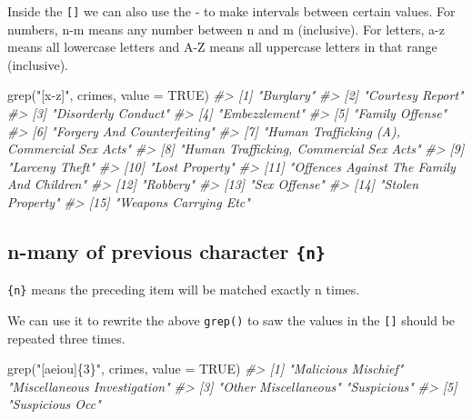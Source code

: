 \documentclass[
  12pt,
]{book}
\newenvironment{Shaded}{\begin{snugshade}}{\end{snugshade}}
\newcommand{\AttributeTok}[1]{\textcolor[rgb]{0.61,0.61,0.61}{#1}}
\newcommand{\CommentTok}[1]{\textcolor[rgb]{0.37,0.37,0.37}{\textit{#1}}}
\newcommand{\ConstantTok}[1]{\textcolor[rgb]{0,0,0}{#1}}
\newcommand{\FunctionTok}[1]{\textcolor[rgb]{0,0,0}{#1}}
\newcommand{\NormalTok}[1]{#1}
\newcommand{\StringTok}[1]{\textcolor[rgb]{0.5,0.5,0.5}{#1}}
\begin{document}
Inside the \texttt{{[}{]}} we can also use the - to make intervals between certain values. For numbers, n-m means any number between n and m (inclusive). For letters, a-z means all lowercase letters and A-Z means all uppercase letters in that range (inclusive).

\begin{Shaded}
\begin{Highlighting}[]
\FunctionTok{grep}\NormalTok{(}\StringTok{"[x{-}z]"}\NormalTok{, crimes, }\AttributeTok{value =} \ConstantTok{TRUE}\NormalTok{)}
\CommentTok{\#\textgreater{}  [1] "Burglary"                                  }
\CommentTok{\#\textgreater{}  [2] "Courtesy Report"                           }
\CommentTok{\#\textgreater{}  [3] "Disorderly Conduct"                        }
\CommentTok{\#\textgreater{}  [4] "Embezzlement"                              }
\CommentTok{\#\textgreater{}  [5] "Family Offense"                            }
\CommentTok{\#\textgreater{}  [6] "Forgery And Counterfeiting"                }
\CommentTok{\#\textgreater{}  [7] "Human Trafficking (A), Commercial Sex Acts"}
\CommentTok{\#\textgreater{}  [8] "Human Trafficking, Commercial Sex Acts"    }
\CommentTok{\#\textgreater{}  [9] "Larceny Theft"                             }
\CommentTok{\#\textgreater{} [10] "Lost Property"                             }
\CommentTok{\#\textgreater{} [11] "Offences Against The Family And Children"  }
\CommentTok{\#\textgreater{} [12] "Robbery"                                   }
\CommentTok{\#\textgreater{} [13] "Sex Offense"                               }
\CommentTok{\#\textgreater{} [14] "Stolen Property"                           }
\CommentTok{\#\textgreater{} [15] "Weapons Carrying Etc"}
\end{Highlighting}
\end{Shaded}

\hypertarget{n-many-of-previous-character-n}{%
\subsection{\texorpdfstring{n-many of previous character \texttt{\{n\}}}{n-many of previous character \{n\}}}\label{n-many-of-previous-character-n}}

\texttt{\{n\}} means the preceding item will be matched exactly n times.

We can use it to rewrite the above \texttt{grep()} to saw the values in the \texttt{{[}{]}} should be repeated three times.

\begin{Shaded}
\begin{Highlighting}[]
\FunctionTok{grep}\NormalTok{(}\StringTok{"[aeiou]\{3\}"}\NormalTok{, crimes, }\AttributeTok{value =} \ConstantTok{TRUE}\NormalTok{)}
\CommentTok{\#\textgreater{} [1] "Malicious Mischief"          "Miscellaneous Investigation"}
\CommentTok{\#\textgreater{} [3] "Other Miscellaneous"         "Suspicious"                 }
\CommentTok{\#\textgreater{} [5] "Suspicious Occ"}
\end{Highlighting}
\end{Shaded}
\end{document}

